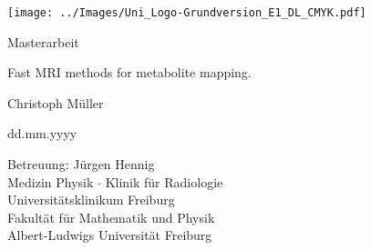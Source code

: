 \documentclass[12pt,a4paper]{scrartcl}
\numberwithin{equation}{section}
\begin{document}
  \pagestyle{empty}

%
  \begin{titlepage}

	\begin{center} \large 

	\texttt{[image: ../Images/Uni\_Logo-Grundversion\_E1\_DL\_CMYK.pdf]} 
    \vspace*{1cm} 

    Masterarbeit
    \vspace*{1cm}

    {\huge Fast MRI methods for metabolite mapping.}
    \vspace*{1.5cm}

    Christoph Müller
    \vspace*{1cm}

    dd.mm.yyyy
    \vspace*{1.5cm}

    Betreuung: Jürgen Hennig \\[.5cm]
		Medizin Physik $\cdot$ Klinik für Radiologie\\
		Universitätsklinikum Freiburg\\[0.5cm]
    
    	Fakultät für Mathematik und Physik \\
		Albert-Ludwigs Universität Freiburg
		
  \end{center}
\end{titlepage}

%
  \tableofcontents

%
\newpage
\pagestyle{headings}





 
%
\newpage
\begin{thebibliography}{Lam00}
 
\end{thebibliography}
      
\end{document}
